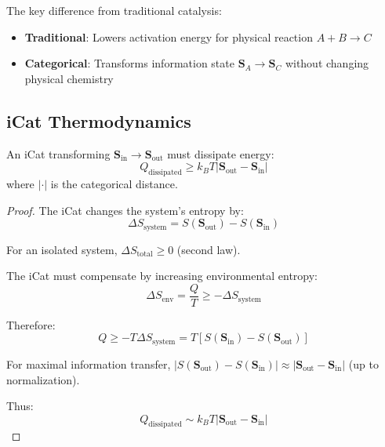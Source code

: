 The key difference from traditional catalysis:
\begin{itemize}
\item \textbf{Traditional}: Lowers activation energy for physical reaction $A + B \to C$
\item \textbf{Categorical}: Transforms information state $\mathbf{S}_A \to \mathbf{S}_C$ without changing physical chemistry
\end{itemize}

\subsection{iCat Thermodynamics}

\begin{theorem}
An iCat transforming $\mathbf{S}_{\text{in}} \to \mathbf{S}_{\text{out}}$ must dissipate energy:
\begin{equation}
Q_{\text{dissipated}} \geq k_B T |\mathbf{S}_{\text{out}} - \mathbf{S}_{\text{in}}|
\end{equation}
where $|\cdot|$ is the categorical distance.
\end{theorem}

\begin{proof}
The iCat changes the system's entropy by:
\begin{equation}
\Delta S_{\text{system}} = S(\mathbf{S}_{\text{out}}) - S(\mathbf{S}_{\text{in}})
\end{equation}

For an isolated system, $\Delta S_{\text{total}} \geq 0$ (second law).

The iCat must compensate by increasing environmental entropy:
\begin{equation}
\Delta S_{\text{env}} = \frac{Q}{T} \geq -\Delta S_{\text{system}}
\end{equation}

Therefore:
\begin{equation}
Q \geq -T\Delta S_{\text{system}} = T[S(\mathbf{S}_{\text{in}}) - S(\mathbf{S}_{\text{out}})]
\end{equation}

For maximal information transfer, $|S(\mathbf{S}_{\text{out}}) - S(\mathbf{S}_{\text{in}})| \approx |\mathbf{S}_{\text{out}} - \mathbf{S}_{\text{in}}|$ (up to normalization).

Thus:
\begin{equation}
Q_{\text{dissipated}} \sim k_B T |\mathbf{S}_{\text{out}} - \mathbf{S}_{\text{in}}|
\end{equation}
\end{proof}

